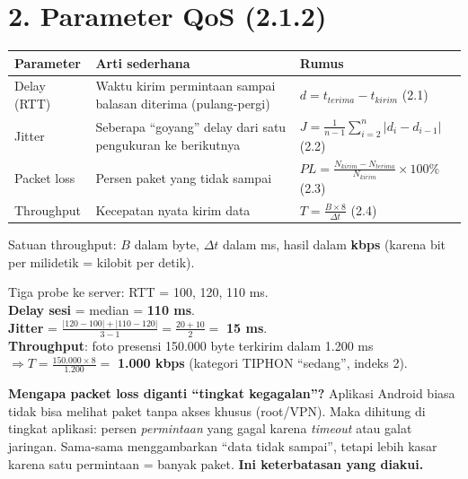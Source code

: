 \section*{2. Parameter QoS (2.1.2)}
\begin{center}
\begin{tabularx}{\linewidth}{@{}p{2.2cm}Xp{4.6cm}@{}}
\toprule
Parameter & Arti sederhana & Rumus \\
\midrule
Delay (RTT) & Waktu kirim permintaan sampai balasan diterima (pulang-pergi) & $d = t_{terima} - t_{kirim}$ \hfill (2.1)\\
Jitter & Seberapa ``goyang'' delay dari satu pengukuran ke berikutnya & $J=\frac{1}{n-1}\sum_{i=2}^{n}|d_i-d_{i-1}|$ \hfill (2.2)\\
Packet loss & Persen paket yang tidak sampai & $PL=\frac{N_{kirim}-N_{terima}}{N_{kirim}}\times100\%$ \hfill (2.3)\\
Throughput & Kecepatan nyata kirim data & $T=\frac{B\times 8}{\Delta t}$ \hfill (2.4)\\
\bottomrule
\end{tabularx}
\end{center}
Satuan throughput: $B$ dalam byte, $\Delta t$ dalam ms, hasil dalam \textbf{kbps} (karena bit per milidetik = kilobit per detik).

\begin{contoh}
Tiga probe ke server: RTT = 100, 120, 110 ms.\\
\textbf{Delay sesi} = median = \textbf{110 ms}.\\
\textbf{Jitter} = $\frac{|120-100|+|110-120|}{3-1}=\frac{20+10}{2}=$ \textbf{15 ms}.\\
\textbf{Throughput}: foto presensi 150.000 byte terkirim dalam 1.200 ms $\Rightarrow T=\frac{150.000\times8}{1.200}=$ \textbf{1.000 kbps} (kategori TIPHON ``sedang'', indeks 2).
\end{contoh}

\textbf{Mengapa packet loss diganti ``tingkat kegagalan''?} Aplikasi Android biasa tidak bisa melihat paket tanpa akses khusus (root/VPN). Maka dihitung di tingkat aplikasi: persen \textit{permintaan} yang gagal karena \textit{timeout} atau galat jaringan. Sama-sama menggambarkan ``data tidak sampai'', tetapi lebih kasar karena satu permintaan = banyak paket. \textbf{Ini keterbatasan yang diakui.}

